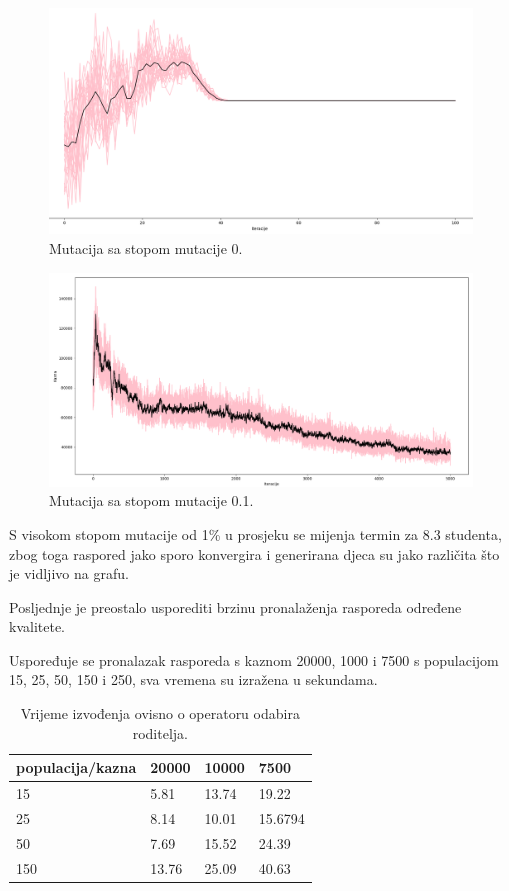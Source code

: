 \documentclass[times, utf8, zavrsni]{fer}
\begin{document}
\begin{figure}[htb]
\centering
\includegraphics[width=14cm]{images/mutacija_nula.png}
\caption{Mutacija sa stopom mutacije 0.}
\label{fig:mutacija_nula}
\end{figure}

\begin{figure}[htb]
\centering
\includegraphics[width=14cm]{images/mutacija_velika.png}
\caption{Mutacija sa stopom mutacije 0.1.}
\label{fig:mutacija_velika}
\end{figure}

S visokom stopom mutacije od 1\% u prosjeku se mijenja termin za 8.3 studenta, zbog toga raspored jako sporo konvergira i generirana djeca su jako različita što je vidljivo na grafu.

Posljednje je preostalo usporediti brzinu pronalaženja rasporeda određene kvalitete. 
\newpage

Uspoređuje se pronalazak rasporeda s kaznom 20000, 1000 i 7500 s populacijom 15, 25, 50, 150 i 250, sva vremena su izražena u sekundama.

\begin{table}[htb]
\caption{Vrijeme izvođenja ovisno o operatoru odabira roditelja.}
\label{tbl:iter-roditelj}
\centering
\begin{tabular}{llll} \hline
populacija/kazna & 20000 &  10000 & 7500\\ \hline
15 & 5.81 & 13.74 & 19.22\\
25 & 8.14 & 10.01 & 15.6794\\
50 & 7.69 & 15.52 & 24.39\\
150 & 13.76 & 25.09 & 40.63\\ \hline
\end{tabular}
\end{table}
\end{document}

